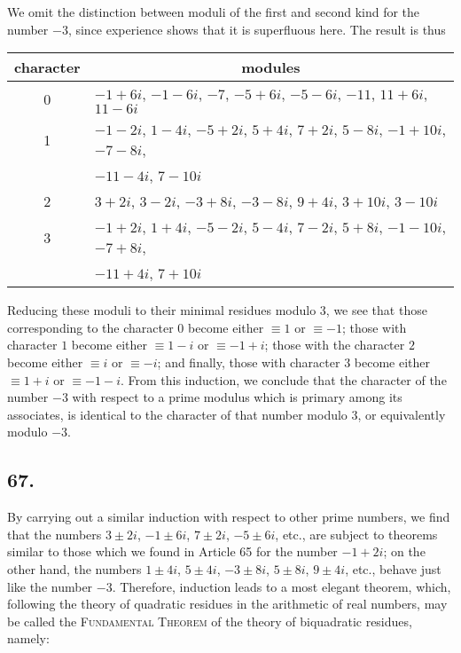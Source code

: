 \documentclass[twoside,12pt]{memoir}
\begin{document}
We omit the distinction between moduli of the first and second kind for the number \(-3\), since experience shows that it is superfluous here. The result is thus
\begin{center}
\begin{tabular}{c|l}
character & \multicolumn{1}{c}{modules} \\
\hline
0 & \(-1+6 i\), \(-1-6 i\), \(-7\), \(-5+6 i\), \(-5-6 i\), \(-11\), \(11+6 i\), \(11-6 i\) \\
1 & \(-1-2 i\), \(1-4 i\), \(-5+2 i\), \(5+4 i\), \(7+2 i\), \(5-8 i\), \(-1+10 i\), \(-7-8 i\),  \\
 & \quad \(-11-4 i\), \(7-10 i\) \\
2 & \(3+2 i\), \(3-2 i\), \(-3+8 i\), \(-3-8 i\), \(9+4 i\), \(3+10 i\), \(3-10 i\) \\
3 & \(-1+2 i\), \(1+4 i\), \(-5-2 i\), \(5-4 i\), \(7-2 i\), \(5+8 i\), \(-1-10 i\), \(-7+8 i\), \\
 & \quad \(-11+4 i\), \(7+10 i\) \\
\end{tabular}
\end{center}

Reducing these moduli to their minimal residues modulo \(3\), we see that those corresponding to the character \(0\) become either \(\equiv 1\) or \(\equiv -1\); those with character \(1\) become either \(\equiv 1-i\) or \(\equiv -1+i\); those with the character \(2\) become either \(\equiv i\) or \(\equiv -i\); and finally, those with character \(3\) become either \(\equiv 1+i\) or \(\equiv -1-i\). From this induction, we conclude that the character of the number \(-3\) with respect to a prime modulus which is primary among its associates, is identical to the character of that number modulo \(3\), or equivalently modulo \(-3\).
%

\subsection*{67.}

By carrying out a similar induction with respect to other prime numbers, we find that the numbers \(3 \pm 2i\), \(-1 \pm 6i\), \(7 \pm 2i\), \(-5 \pm 6i\), etc{.}, are subject to theorems similar to those which we found in Article 65 for the number \(-1+2i\); on the other hand, the numbers \(1 \pm 4i\), \(5 \pm 4i\), \(-3 \pm 8i\), \(5 \pm 8i\), \(9 \pm 4i\), etc{.}, behave just like the number \(-3\). Therefore, induction leads to a most elegant theorem, which, following the theory of quadratic residues in the arithmetic of real numbers, may be called the \textsc{Fundamental Theorem} of the theory of biquadratic residues, namely:
\end{document}
